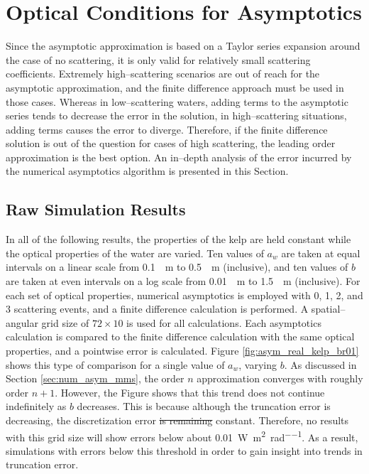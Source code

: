 \documentclass[ms,cpyr,lof,lot]{uathesis}
\providecommand{\DIFadd}[1]{{\protect\color{blue}\uwave{#1}}} %
\providecommand{\DIFdel}[1]{{\protect\color{red}\sout{#1}}}                      %
\providecommand{\DIFaddbegin}{} %
\providecommand{\DIFaddend}{} %
\providecommand{\DIFdelbegin}{} %
\providecommand{\DIFdelend}{} %
\newcommand{\DIFscaledelfig}{0.5}
\newlength{\DIFdelgraphicswidth} %
\newlength{\DIFdelgraphicsheight} %
\newcommand{\DIFaddincludegraphics}[2][]{{\color{blue}\fbox{\DIFOincludegraphics[#1]{#2}}}} %
\newcommand{\DIFdelincludegraphics}[2][]{%
\sbox{\DIFdelgraphicsbox}{\DIFOincludegraphics[#1]{#2}}%
\settoboxwidth{\DIFdelgraphicswidth}{\DIFdelgraphicsbox} %
\settoboxtotalheight{\DIFdelgraphicsheight}{\DIFdelgraphicsbox} %
\scalebox{\DIFscaledelfig}{%
\parbox[b]{\DIFdelgraphicswidth}{\usebox{\DIFdelgraphicsbox}\\[-\baselineskip] \rule{\DIFdelgraphicswidth}{0em}}\llap{\resizebox{\DIFdelgraphicswidth}{\DIFdelgraphicsheight}{%
\setlength{\unitlength}{\DIFdelgraphicswidth}%
\begin{picture}(1,1)%
\thicklines\linethickness{2pt} %
{\color[rgb]{1,0,0}\put(0,0){\framebox(1,1){}}}%
{\color[rgb]{1,0,0}\put(0,0){\line( 1,1){1}}}%
{\color[rgb]{1,0,0}\put(0,1){\line(1,-1){1}}}%
\end{picture}%
}\hspace*{3pt}}} %
} %
\DeclareRobustCommand{\DIFaddbegin}{\DIFOaddbegin \let\includegraphics\DIFaddincludegraphics} %
\DeclareRobustCommand{\DIFaddend}{\DIFOaddend \let\includegraphics\DIFOincludegraphics} %
\DeclareRobustCommand{\DIFdelbegin}{\DIFOdelbegin \let\includegraphics\DIFdelincludegraphics} %
\DeclareRobustCommand{\DIFdelend}{\DIFOaddend \let\includegraphics\DIFOincludegraphics} %
\begin{document}
\section{Optical Conditions for Asymptotics}
Since the asymptotic approximation is based on a Taylor series expansion around the case of no scattering, it is only valid for relatively small scattering coefficients.
Extremely high--scattering scenarios are out of reach for the asymptotic approximation, and the finite difference approach must be used in those cases.
Whereas in low--scattering waters, adding terms to the asymptotic series tends to decrease the error in the solution, in high--scattering situations, adding terms causes the error to diverge.
Therefore, if the finite difference solution is out of the question for cases of high scattering, the leading order approximation is the best option.
An in--depth analysis of the error incurred by the numerical asymptotics algorithm is presented in this Section.

\subsection{Raw Simulation Results}
\label{sec:iop_study_raw}
In all of the following results, the properties of the kelp are held constant while the optical properties of the water are varied.
Ten values of $a_w$ are taken at equal intervals on a linear scale from \SI{0.1}{\per\m} to \SI{0.5}{\per\m} (inclusive), and ten values of $b$ are taken at even intervals on a log scale from \SI{0.01}{\per\m} to \SI{1.5}{\per\m} (inclusive).
For each set of optical properties, numerical asymptotics is employed with 0, 1, 2, and 3 scattering events, and a finite difference calculation is performed.
A spatial--angular grid size of $72 \times 10$ is used for all calculations.
Each asymptotics calculation is compared to the finite difference calculation with the same optical properties, and a pointwise error is calculated.
Figure \ref{fig:asym_real_kelp_br01} shows this type of comparison for a single value of $a_w$, varying $b$.
As discussed in Section \ref{sec:num_asym_mms}, the order $n$ approximation converges with roughly order $n+1$.
However, the Figure shows that this trend does not continue indefinitely as $b$ decreases.
This is because although the truncation error is decreasing, the discretization error \DIFdelbegin \DIFdel{is remaining }\DIFdelend \DIFaddbegin \DIFadd{remains }\DIFaddend constant.
Therefore, no results with this grid size will show errors below about \SI{0.01}{\W\per\m\squared\per\radian}.
As a result, simulations with errors below this threshold \DIFaddbegin \DIFadd{are discarded }\DIFaddend in order to gain insight into trends in truncation error.
\end{document}
